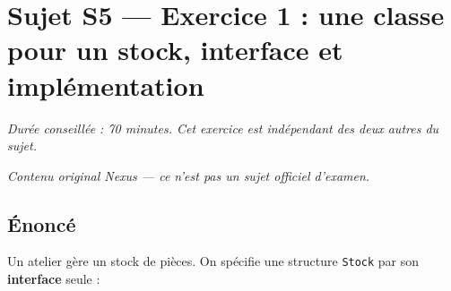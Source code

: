 \section*{Sujet S5 --- Exercice 1 : une classe pour un stock, interface et implémentation}

\textit{Durée conseillée : 70 minutes. Cet exercice est indépendant des deux
autres du sujet.}

\medskip
\textit{Contenu original Nexus --- ce n'est pas un sujet officiel d'examen.}

\subsection*{Énoncé}

Un atelier gère un stock de pièces. On spécifie une structure \lstinline{Stock}
par son \textbf{interface} seule :

